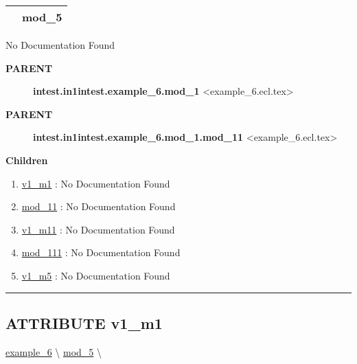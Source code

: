 {\renewcommand{\arraystretch}{1.5}
\begin{tabularx}{\textwidth}{|>{\raggedright\arraybackslash}l|X|}
\hline
\hspace{0pt}\mytexttt{\color{red} } & \textbf{mod\_5} \\
\hline
\end{tabularx}
}

\par





No Documentation Found










\par
\begin{description}
\item [\colorbox{tagtype}{\color{white} \textbf{\textsf{PARENT}}}] \textbf{intest.in1intest.example\_6.mod\_1} <example\_6.ecl.tex>
\item [\colorbox{tagtype}{\color{white} \textbf{\textsf{PARENT}}}] \textbf{intest.in1intest.example\_6.mod\_1.mod\_11} <example\_6.ecl.tex>
\end{description}


\textbf{Children}
\begin{enumerate}
\item \hyperlink{ecldoc:intest.in1intest.example_6.mod_1.v1_m1}{v1\_m1}
: No Documentation Found
\item \hyperlink{ecldoc:intest.in1intest.example_6.mod_1.mod_11}{mod\_11}
: No Documentation Found
\item \hyperlink{ecldoc:intest.in1intest.example_6.mod_1.mod_11.v1_m11}{v1\_m11}
: No Documentation Found
\item \hyperlink{ecldoc:intest.in1intest.example_6.mod_1.mod_11.mod_111}{mod\_111}
: No Documentation Found
\item \hyperlink{ecldoc:intest.in1intest.example_6.mod_5.v1_m5}{v1\_m5}
: No Documentation Found
\end{enumerate}

\rule{\linewidth}{0.5pt}

\subsection*{\textsf{\colorbox{headtoc}{\color{white} ATTRIBUTE}
v1\_m1}}

\hypertarget{ecldoc:intest.in1intest.example_6.mod_1.v1_m1}{}
\hspace{0pt} \hyperlink{ecldoc:intest.in1intest.example_6}{example_6} \textbackslash 
\hspace{0pt} \hyperlink{ecldoc:intest.in1intest.example_6.mod_5}{mod_5} \textbackslash 

